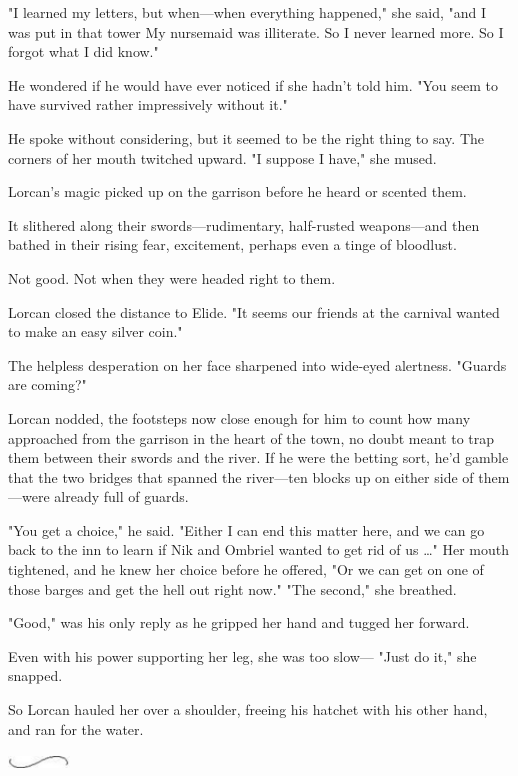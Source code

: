 "I learned my letters, but when---when everything happened," she said, "and I was put in that tower  My nursemaid was illiterate. So I never learned more. So I forgot what I did know."

He wondered if he would have ever noticed if she hadn't told him. "You seem to have survived rather impressively without it."

He spoke without considering, but it seemed to be the right thing to say. The corners of her mouth twitched upward. "I suppose I have," she mused.

Lorcan's magic picked up on the garrison before he heard or scented them.

It slithered along their swords---rudimentary, half-rusted weapons---and then bathed in their rising fear, excitement, perhaps even a tinge of bloodlust.

Not good. Not when they were headed right to them.

Lorcan closed the distance to Elide. "It seems our friends at the carnival wanted to make an easy silver coin."

The helpless desperation on her face sharpened into wide-eyed alertness. "Guards are coming?"

Lorcan nodded, the footsteps now close enough for him to count how many approached from the garrison in the heart of the town, no doubt meant to trap them between their swords and the river. If he were the betting sort, he'd gamble that the two bridges that spanned the river---ten blocks up on either side of them ---were already full of guards.

"You get a choice," he said. "Either I can end this matter here, and we can go back to the inn to learn if Nik and Ombriel wanted to get rid of us \ldots" Her mouth tightened, and he knew her choice before he offered, "Or we can get on one of those barges and get the hell out right now." "The second," she breathed.

"Good," was his only reply as he gripped her hand and tugged her forward.

Even with his power supporting her leg, she was too slow--- "Just do it," she snapped.

So Lorcan hauled her over a shoulder, freeing his hatchet with his other hand, and ran for the water.

\includegraphics[width=0.65in,height=0.13in]{images/seperator}

